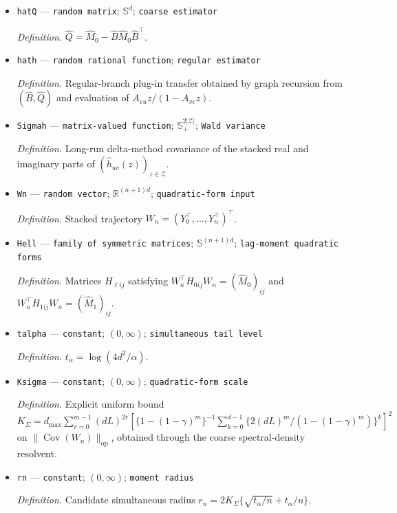 \documentclass{article}
\begin{document}
\begin{itemize}
  \item \texttt{hatQ} --- \texttt{random matrix}; \(\mathbb S^d\); \texttt{coarse estimator}
  \par\smallskip\noindent\emph{Definition.} \(\widehat Q=\widehat M_0-\widehat B\widehat M_0\widehat B^\top\).
  \item \texttt{hath} --- \texttt{random rational function}; \texttt{regular estimator}
  \par\smallskip\noindent\emph{Definition.} Regular-branch plug-in transfer obtained by graph recursion from \((\widehat B,\widehat Q)\) and evaluation of \(A_{vu}z/(1-A_{vv}z)\).
  \item \texttt{Sigmah} --- \texttt{matrix-\allowbreak{}valued function}; \(\mathbb S_+^{2|\mathcal Z|}\); \texttt{Wald variance}
  \par\smallskip\noindent\emph{Definition.} Long-run delta-method covariance of the stacked real and imaginary parts of \((\widehat h_{uv}(z))_{z\in\mathcal Z}\).
  \item \texttt{Wn} --- \texttt{random vector}; \(\mathbb R^{(n+1)d}\); \texttt{quadratic-\allowbreak{}form input}
  \par\smallskip\noindent\emph{Definition.} Stacked trajectory \(W_n=(Y_0^\top,\ldots,Y_n^\top)^\top\).
  \item \texttt{Hell} --- \texttt{family of symmetric matrices}; \(\mathbb S^{(n+1)d}\); \texttt{lag-\allowbreak{}moment quadratic forms}
  \par\smallskip\noindent\emph{Definition.} Matrices \(H_{\ell ij}\) satisfying \(W_n^\top H_{0ij}W_n=(\widehat M_0)_{ij}\) and \(W_n^\top H_{1ij}W_n=(\widehat M_1)_{ij}\).
  \item \texttt{talpha} --- \texttt{constant}; \((0,\infty)\); \texttt{simultaneous tail level}
  \par\smallskip\noindent\emph{Definition.} \(t_\alpha=\log(4d^2/\alpha)\).
  \item \texttt{Ksigma} --- \texttt{constant}; \((0,\infty)\); \texttt{quadratic-\allowbreak{}form scale}
  \par\smallskip\noindent\emph{Definition.} Explicit uniform bound \(K_\Sigma=d_{\max}\sum_{r=0}^{m-1}(dL)^{2r}\left[\{1-(1-\gamma)^m\}^{-1}\sum_{k=0}^{d-1}\{2(dL)^m/(1-(1-\gamma)^m)\}^k\right]^2\) on \(\|\operatorname{Cov}(W_n)\|_{\mathrm{op}}\), obtained through the coarse spectral-density resolvent.
  \item \texttt{rn} --- \texttt{constant}; \((0,\infty)\); \texttt{moment radius}
  \par\smallskip\noindent\emph{Definition.} Candidate simultaneous radius \(r_n=2K_\Sigma\{\sqrt{t_\alpha/n}+t_\alpha/n\}\).

\end{itemize}
\end{document}
